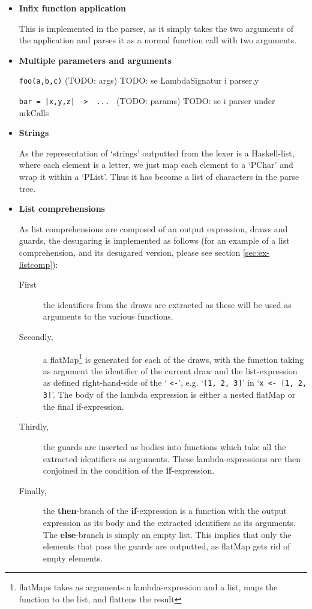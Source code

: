\begin{itemize}
  \item \textbf{Infix function application}
    
    This is implemented in the parser, as it simply takes the two arguments of the application and parses it as a normal function call with two arguments.

  \item \textbf{Multiple parameters and arguments}

    \texttt{foo(a,b,c)} (TODO: args) TODO: se LambdaSignatur i parser.y

    \texttt{bar = |x,y,z| -> { ... }} (TODO: params) TODO: se i parser under mkCalls



  \item \textbf{Strings}

    As the representation of `strings' outputted from the lexer is a Haskell-list, where each element is a letter, we just map each element to a `PChar' and wrap it within a `PList'. Thus it has become a list of characters in the parse tree.

  \item \textbf{List comprehensions}
    
    As list comprehensions are composed of an output expression, draws and guards, the desugaring is implemented as follows (for an example of a list comprehension, and its desugared version,  please see section \ref{sec:ex-listcomp}):
    \begin{description}
      \item[First] the identifiers from the draws are extracted as these will be used as arguments to the various functions.
      \item[Secondly,] a flatMap\footnote{flatMaps takes as arguments a lambda-expression and a list, maps the function to the list, and flattens the result} is generated for each of the draws, with the function taking as argument the identifier of the current draw and the list-expression as defined right-hand-side of the ` \texttt{<-}', e.g. `\texttt{[1, 2, 3]}' in `\texttt{x <- [1, 2, 3]}'. The body of the lambda expression is either a nested flatMap or the final if-expression.
        \item[Thirdly,] the guards are inserted as bodies into functions which take all the extracted identifiers as arguments. These lambda-expressions are then conjoined in the condition of the \textbf{if}-expression.
      \item[Finally,] the \textbf{then}-branch of the \textbf{if}-expression is a function with the output expression as its body and the extracted identifiers as its arguments. The \textbf{else}-branch is simply an empty list. This implies that only the elements that pass the guards are outputted, as flatMap gets rid of empty elements.
    \end{description}

    
\end{itemize}

